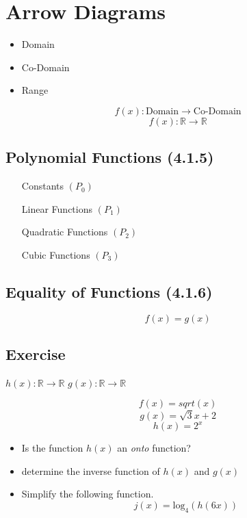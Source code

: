 \documentclass[]{report}
\begin{document}
\section{Arrow Diagrams}

\begin{itemize}

\item Domain
\item Co-Domain
\item Range
\end{itemize}
\[  f(x) : \mbox{Domain} \rightarrow \mbox{Co-Domain} \]
\[  f(x) : \mathbb{R} \rightarrow \mathbb{R} \]
\newpage
\subsection*{Polynomial Functions (4.1.5)}

\begin{itemize}
\item[Constants] $(P_0)$
\item[Linear Functions] $(P_1)$
\item[Quadratic Functions] $(P_2)$
\item[Cubic Functions] $(P_3)$
\end{itemize}


\subsection*{Equality of Functions (4.1.6)}
\[f(x) = g(x) \]




\subsection{Exercise} 
$h(x): \mathbb{R} \rightarrow \mathbb{R}$ 
$g(x): \mathbb{R} \rightarrow \mathbb{R}$

\[f(x) = sqrt(x)\]
\[g(x) = \sqrt{3}{x+2}\]
\[h(x) = 2^x\]

\begin{itemize}
\item Is the function $h(x)$ an \textit{onto} function?
\item determine the inverse function of $h(x)$ and $g(x)$
\item Simplify the following function.
\[ j(x) = \mbox{log}_4(h(6x))\]
\end{itemize}
\end{document}
